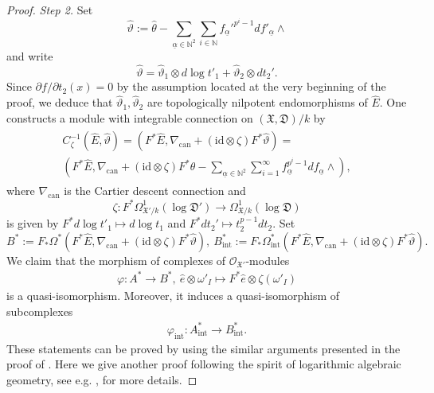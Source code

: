 \documentclass[12pt, a4paper]{article}
\begin{document}
\begin{proof}
{\itshape Step 2.} Set
$$
\hat\vartheta:=\hat\theta-\sum_{\underline\alpha\in\mathbb N^2}\sum_{i\in\mathbb N} f_{\underline\alpha}'^{p^i-1}df'_{\underline\alpha}\wedge
$$
and write
$$
\hat\vartheta=\hat\vartheta_1\otimes d\log t'_1+\hat\vartheta_2\otimes d t_2'.
$$
Since $\partial f/\partial t_2(x)=0$ by the assumption located at the very beginning of the proof, we deduce that $\hat\vartheta_1,\hat\vartheta_2$ are topologically nilpotent endomorphisms of $\hat E$. One constructs a module with integrable connection on $(\mathfrak X,\mathfrak D)/k$ by
\begin{eqnarray}\label{inverse Cartier transform}
\begin{array}{c}
C_\zeta^{-1}(\hat E,\hat\vartheta)=(F^*\hat E,\nabla_\mathrm{can}+(\mathrm{id}\otimes\zeta)F^*\hat\vartheta)=\\
(F^*\hat E,\nabla_\mathrm{can}+(\mathrm{id}\otimes\zeta)F^*\theta-\sum_{\underline\alpha\in\mathbb N^2}\sum_{i=1}^\infty f_{\underline\alpha}^{p^i-1}df_{\underline\alpha}\wedge),
\end{array}
\end{eqnarray}
where $\nabla_\mathrm{can}$ is the Cartier descent connection and 
$$\zeta:F^*\Omega^1_{\mathfrak X'/k}(\log\mathfrak D')\to\Omega^1_{\mathfrak X/k}(\log\mathfrak D)$$ is given by $F^*d\log t'_1\mapsto d\log t_1$ and $F^*dt_2'\mapsto t_2^{p-1}dt_2$. Set
$$
B^*:=F_*\Omega^*(F^*\hat E,\nabla_\mathrm{can}+(\mathrm{id}\otimes\zeta)F^*\hat\vartheta),~B^*_\mathrm{int}:=F_*\Omega_\mathrm{int}^*(F^*\hat E,\nabla_\mathrm{can}+(\mathrm{id}\otimes\zeta)F^*\hat\vartheta).$$
We claim that the morphism of complexes of $\mathcal O_{\mathfrak X'}$-modules 
\begin{eqnarray}\label{varphi}
\varphi:A^*\to B^*,~\hat e\otimes\omega'_I\mapsto F^*\hat e\otimes\zeta(\omega'_I)
\end{eqnarray}
is a quasi-isomorphism. Moreover, it induces a quasi-isomorphism of subcomplexes 
\begin{eqnarray}\label{varphi int}
\varphi_\mathrm{int}:A_\mathrm{int}^*\to B_\mathrm{int}^*.
\end{eqnarray}
These statements can be proved by using the similar arguments presented in the proof of \cite[Proposition 3.8]{SZ2}. Here we give another proof following the spirit of logarithmic algebraic  geometry, see e.g. \cite{Kato}, \cite{O18} for more details.


\end{proof}
\end{document}
